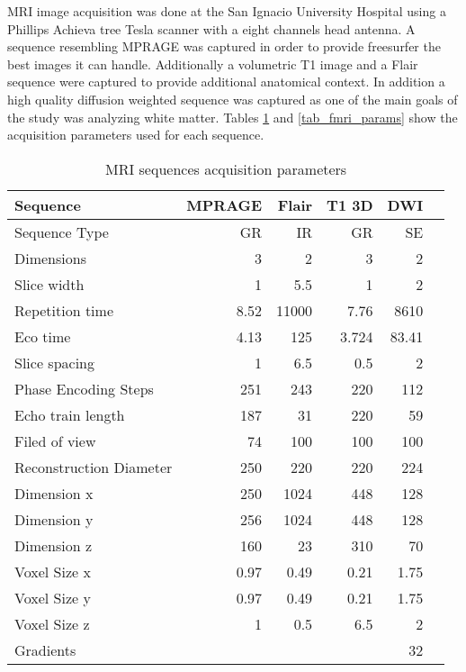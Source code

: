 MRI image acquisition was done at the San Ignacio University Hospital using a Phillips Achieva tree Tesla scanner with a eight channels head  antenna. A sequence resembling MPRAGE was captured in order to provide freesurfer the best images it can handle. Additionally a volumetric T1 image and a Flair sequence were captured to provide additional anatomical context. In addition a high quality diffusion weighted sequence was captured as one of the main goals of the study was analyzing white matter. Tables \ref{tab_mri_params} and \ref{tab_fmri_params} show the acquisition parameters used for each sequence. 
\begin{table}
	\centering
	\footnotesize
		\begin{tabular}{l|rrrrr}
				Sequence&MPRAGE	&Flair	&T1 3D &DWI\\ \hline				
				Sequence Type	&GR	&IR	&GR &SE\\ 
				Dimensions	&3	&2	&3 &2\\
				Slice width	&1	&5.5	&1 &2\\
				Repetition time	&8.52	&11000	&7.76 &8610\\
				Eco time	&4.13	&125	&3.724 &83.41\\
				Slice spacing	&1	&6.5	&0.5 &2\\
				Phase Encoding Steps	&251	&243	&220 &112\\
				Echo train length	&187	&31	&220 &59\\
				Filed of view	&74	&100	&100 &100\\
				Reconstruction	Diameter&250	&220	&220 &224\\\hline
				Dimension x &250	&1024 &448  &128 \\
				Dimension y &256	&1024 &448 &128 \\
				Dimension z &160	&23 &310 &70 \\ \hline
				Voxel Size x	&0.97 &0.49 &0.21  &1.75 \\
				Voxel Size y	&0.97 &0.49 &0.21 &1.75 \\
				Voxel Size z	&1  &0.5 &6.5 &2 \\ \hline
				Gradients   &    &    &    &    32 \\
		\end{tabular}
	\caption{MRI sequences acquisition parameters}
	\label{tab_mri_params}
\end{table}


